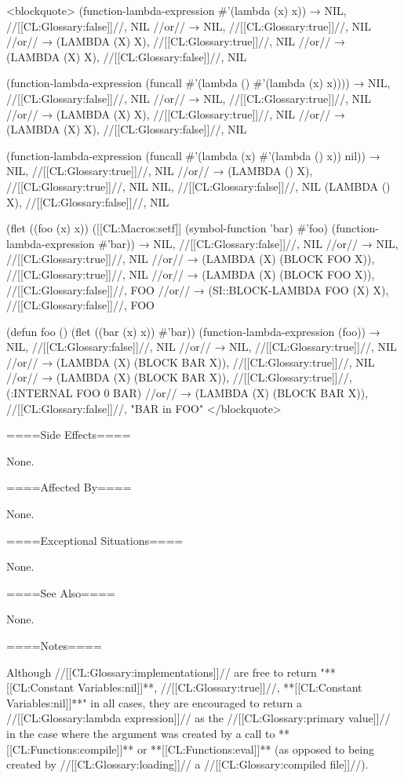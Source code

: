 <blockquote> (function-lambda-expression #'(lambda (x) x)) → NIL, //[[CL:Glossary:false]]//, NIL //or// → NIL, //[[CL:Glossary:true]]//, NIL //or// → (LAMBDA (X) X), //[[CL:Glossary:true]]//, NIL //or// → (LAMBDA (X) X), //[[CL:Glossary:false]]//, NIL

(function-lambda-expression (funcall #'(lambda () #'(lambda (x) x)))) → NIL, //[[CL:Glossary:false]]//, NIL //or// → NIL, //[[CL:Glossary:true]]//, NIL //or// → (LAMBDA (X) X), //[[CL:Glossary:true]]//, NIL //or// → (LAMBDA (X) X), //[[CL:Glossary:false]]//, NIL

(function-lambda-expression (funcall #'(lambda (x) #'(lambda () x)) nil)) → NIL, //[[CL:Glossary:true]]//, NIL //or// → (LAMBDA () X), //[[CL:Glossary:true]]//, NIL \NV NIL, //[[CL:Glossary:false]]//, NIL \NV (LAMBDA () X), //[[CL:Glossary:false]]//, NIL

(flet ((foo (x) x)) ([[CL:Macros:setf]] (symbol-function 'bar) #'foo) (function-lambda-expression #'bar)) → NIL, //[[CL:Glossary:false]]//, NIL //or// → NIL, //[[CL:Glossary:true]]//, NIL //or// → (LAMBDA (X) (BLOCK FOO X)), //[[CL:Glossary:true]]//, NIL //or// → (LAMBDA (X) (BLOCK FOO X)), //[[CL:Glossary:false]]//, FOO //or// → (SI::BLOCK-LAMBDA FOO (X) X), //[[CL:Glossary:false]]//, FOO

(defun foo () (flet ((bar (x) x)) #'bar)) (function-lambda-expression (foo)) → NIL, //[[CL:Glossary:false]]//, NIL //or// → NIL, //[[CL:Glossary:true]]//, NIL //or// → (LAMBDA (X) (BLOCK BAR X)), //[[CL:Glossary:true]]//, NIL //or// → (LAMBDA (X) (BLOCK BAR X)), //[[CL:Glossary:true]]//, (:INTERNAL FOO 0 BAR) //or// → (LAMBDA (X) (BLOCK BAR X)), //[[CL:Glossary:false]]//, "BAR in FOO" </blockquote>

====Side Effects====

None.

====Affected By====

None.

====Exceptional Situations====

None.

====See Also====

None.

====Notes====

Although //[[CL:Glossary:implementations]]// are free to return "**[[CL:Constant Variables:nil]]**, //[[CL:Glossary:true]]//, **[[CL:Constant Variables:nil]]**" in all cases, they are encouraged to return a //[[CL:Glossary:lambda expression]]// as the //[[CL:Glossary:primary value]]// in the case where the argument was created by a call to **[[CL:Functions:compile]]** or **[[CL:Functions:eval]]** (as opposed to being created by //[[CL:Glossary:loading]]// a //[[CL:Glossary:compiled file]]//).

